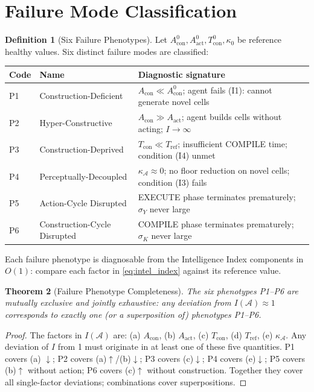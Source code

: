 \documentclass[twocolumn,11pt,a4paper]{article}
\theoremstyle{plain}
\newtheorem{theorem}{Theorem}[section]
\theoremstyle{definition}
\newtheorem{definition}[theorem]{Definition}
\theoremstyle{remark}
\begin{document}
\section{Failure Mode Classification}
\label{sec:failure}

\begin{definition}[Six Failure Phenotypes]
\label{def:failure}
Let $A_\mathrm{con}^0, A_\mathrm{act}^0, T_\mathrm{con}^0, \kappa_0$ be reference healthy values.  Six distinct failure modes are classified:
\begin{center}
\begin{tabular}{llp{7cm}}
\toprule
Code & Name & Diagnostic signature \\
\midrule
P1 & Construction-Deficient & $A_\mathrm{con} \ll A_\mathrm{con}^0$; agent fails (I1): cannot generate novel cells \\
P2 & Hyper-Constructive & $A_\mathrm{con} \gg A_\mathrm{act}$; agent builds cells without acting; $I \to \infty$ \\
P3 & Construction-Deprived & $T_\mathrm{con} \ll T_\mathrm{ref}$; insufficient COMPILE time; condition (I4) unmet \\
P4 & Perceptually-Decoupled & $\kappa_\mathcal{A} \approx 0$; no floor reduction on novel cells; condition (I3) fails \\
P5 & Action-Cycle Disrupted & EXECUTE phase terminates prematurely; $\sigma_Y$ never large \\
P6 & Construction-Cycle Disrupted & COMPILE phase terminates prematurely; $\sigma_K$ never large \\
\bottomrule
\end{tabular}
\end{center}
Each failure phenotype is diagnosable from the Intelligence Index components in $O(1)$: compare each factor in \eqref{eq:intel_index} against its reference value.
\end{definition}

\begin{theorem}[Failure Phenotype Completeness]
\label{thm:failure_complete}
The six phenotypes P1--P6 are mutually exclusive and jointly exhaustive: any deviation from $I(\mathcal{A}) \approx 1$ corresponds to exactly one (or a superposition of) phenotypes P1--P6.
\end{theorem}

\begin{proof}
The factors in $I(\mathcal{A})$ are: (a) $A_\mathrm{con}$, (b) $A_\mathrm{act}$, (c) $T_\mathrm{con}$, (d) $T_\mathrm{ref}$, (e) $\kappa_\mathcal{A}$.  Any deviation of $I$ from 1 must originate in at least one of these five quantities.  P1 covers (a) $\downarrow$; P2 covers (a)$\uparrow$/(b)$\downarrow$; P3 covers (c)$\downarrow$; P4 covers (e)$\downarrow$; P5 covers (b)$\uparrow$ without action; P6 covers (c)$\uparrow$ without construction.  Together they cover all single-factor deviations; combinations cover superpositions.
\end{proof}
\end{document}
